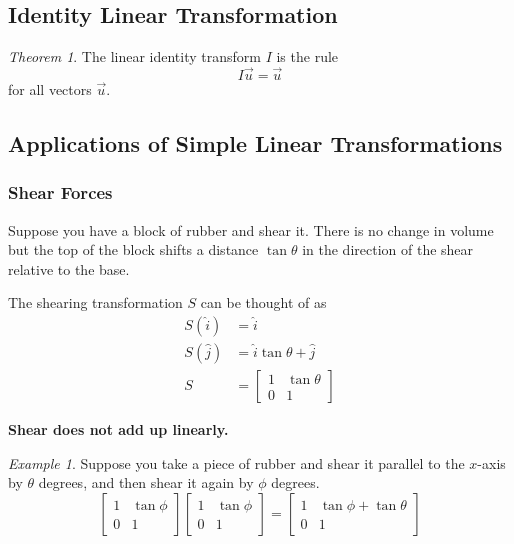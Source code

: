 \documentclass[a4paper]{article}
\theoremstyle{remark}
\newtheorem{example}{Example}
\theoremstyle{theorem}
\newtheorem{theorem}{Theorem}
\begin{document}
\subsection{Identity Linear Transformation}
\begin{theorem}
	The linear identity transform $I$ is the rule
	\begin{equation}
		I\vec{u} = \vec{u}
	\end{equation}
	for all vectors $\vec{u}$.
\end{theorem}


\subsection{Applications of Simple Linear Transformations}
\subsubsection{Shear Forces}
Suppose you have a block of rubber and shear it.
There is no change in volume but the top of the block shifts a distance $\tan{\theta}$ in the direction of the shear relative to the base.

The shearing transformation $S$ can be thought of as
\begin{align}
	S(\hat{i}) 	& = \hat{i}\\
	S(\hat{j}) 	& = \hat{i}\tan{\theta} + \hat{j} \\
	S			& = \begin{bmatrix} 1 & \tan{\theta} \\ 0 & 1 \end{bmatrix}
\end{align}

\textbf{Shear does not add up linearly.}

\begin{example}
	Suppose you take a piece of rubber and shear it parallel to the $x$-axis by $\theta$ degrees, and then shear it again by $\phi$ degrees.
	\begin{equation}
		\begin{bmatrix}
			1	& \tan{\phi} \\
			0 	& 1
		\end{bmatrix}
		\begin{bmatrix}
			1	& \tan{\phi} \\
			0 	& 1
		\end{bmatrix}
		=
		\begin{bmatrix}
			1	& \tan{\phi} + \tan{\theta}\\
			0 	& 1
		\end{bmatrix}
	\end{equation}
\end{example}
\end{document}
